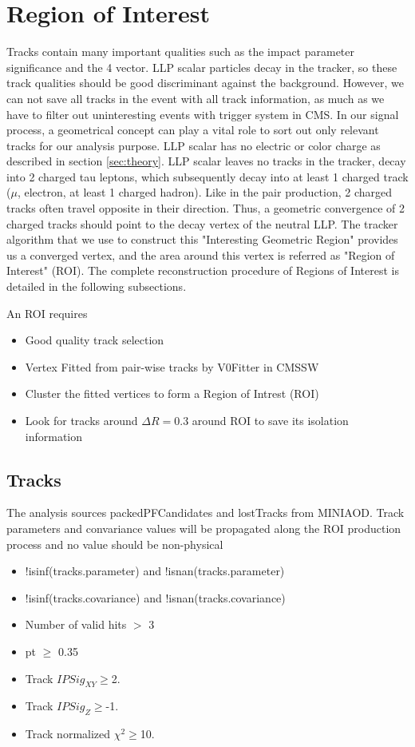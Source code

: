 \section{Region of Interest}\label{sec:ROIs}
Tracks contain many important qualities such as the impact parameter significance and the 4 vector.
LLP scalar particles decay in the tracker, so these track qualities should be good discriminant against the background.
However, we can not save all tracks in the event with all track information, as much as we have to filter out uninteresting events with trigger system in CMS.
In our signal process, a geometrical concept can play a vital role to sort out only relevant tracks for our analysis purpose.
LLP scalar has no electric or color charge as described in section \ref{sec:theory}.
LLP scalar leaves no tracks in the tracker, decay into 2 charged tau leptons, which subsequently decay into at least 1 charged track ($\mu$, electron, at least 1 charged hadron). 
Like in the pair production, 2 charged tracks often travel opposite in their direction.
Thus, a geometric convergence of 2 charged tracks should point to the decay vertex of the neutral LLP.
The tracker algorithm that we use to construct this "Interesting Geometric Region" provides us a converged vertex, and the area around this vertex is referred as "Region of Interest" (ROI).
The complete reconstruction procedure of Regions of Interest is detailed in the following subsections.

An ROI requires
\begin{itemize}
  \item Good quality track selection
  \item Vertex Fitted from pair-wise tracks by V0Fitter in CMSSW
  \item Cluster the fitted vertices to form a Region of Intrest (ROI)
  \item Look for tracks around $\Delta R=0.3$ around ROI to save its isolation information
\end{itemize}

\subsection{Tracks}\label{sec:ROI_tracks}

The analysis sources packedPFCandidates and lostTracks from MINIAOD.
Track parameters and convariance values will be propagated along the ROI production process and no value should be non-physical
\begin{itemize}
  \item !isinf(tracks.parameter)  and !isnan(tracks.parameter) 
  \item !isinf(tracks.covariance) and !isnan(tracks.covariance) 
  \item Number of valid hits $>$ 3
  \item pt $\geq$ 0.35
  \item Track $IPSig_{XY}\geq$2.
  \item Track $IPSig_{Z}\geq$-1.
  \item Track normalized $\chi^{2}\geq$10.
\end{itemize}


